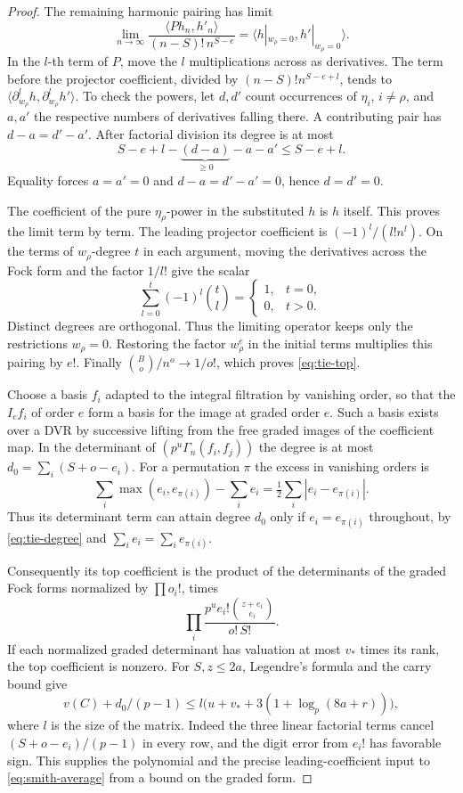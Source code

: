 \begin{proof}
The remaining harmonic pairing has limit
\[
  \lim_{n\to\infty}\frac{\langle P h_n,h'_n\rangle}
                            {(n-S)!\,n^{S-e}}
       =\langle h|_{w_\rho=0},h'|_{w_\rho=0}\rangle .
\]
In the \(l\)-th term of \(P\), move the \(l\) multiplications
across as derivatives. The term before the projector coefficient,
divided by \((n-S)! n^{S-e+l}\), tends to
\(\langle \partial_{w_\rho}^l h,\partial_{w_\rho}^l h'\rangle\).
To check the powers, let \(d,d'\) count occurrences of
\(\eta_i\), \(i\ne\rho\), and \(a,a'\) the respective numbers
of derivatives falling there. A contributing pair has
\(d-a=d'-a'\). After factorial division its degree is at most
\[
 S-e+l-\underbrace{(d-a)}_{\ge0}-a-a'\le S-e+l.
\]
Equality forces \(a=a'=0\) and \(d-a=d'-a'=0\), hence \(d=d'=0\).

The coefficient of the pure
\(\eta_\rho\)-power in the substituted \(h\) is \(h\) itself.
This proves the limit term by term. The leading projector
coefficient is \((-1)^l/(l! n^l)\). On the terms of \(w_\rho\)-degree \(t\) in each argument,
moving the derivatives across the Fock form and the factor
\(1/l!\) give the scalar
\[
       \sum_{l=0}^t(-1)^l\binom tl
           =\begin{cases}1,&t=0,\\0,&t>0.\end{cases}
\]
Distinct degrees are orthogonal. Thus the limiting operator
keeps only the restrictions \(w_\rho=0\). Restoring the factor
\(w_\rho^e\) in the initial terms multiplies this pairing by
\(e!\). Finally \(\binom Bo/n^o\to1/o!\),
which proves \eqref{eq:tie-top}.

Choose a basis \(f_i\) adapted to the integral filtration by
vanishing order, so that the \(I_e f_i\) of order \(e\) form
a basis for the image at graded order \(e\). Such a basis
exists over a DVR by successive lifting from the free graded
images of the coefficient map. In the determinant of
\((p^u\Gamma_n(f_i,f_j))\) the degree is at most
\(d_0=\sum_i(S+o-e_i)\). For a permutation \(\pi\) the excess in vanishing orders is
\[
 \sum_i\max(e_i,e_{\pi(i)})-\sum_i e_i =\tfrac12\sum_i|e_i-e_{\pi(i)}|.
\]
Thus its determinant term can attain degree \(d_0\) only if \(e_i=e_{\pi(i)}\) throughout, by
\eqref{eq:tie-degree} and \(\sum_i e_i=\sum_i e_{\pi(i)}\).

Consequently its top coefficient is the product of the
determinants of the graded Fock forms normalized by \(\prod o_i!\),
times
\[
                  \prod_i\frac{p^u e_i!\binom{z+e_i}{e_i}}
                                         {o!\,S!}.
\]
If each normalized graded determinant has valuation at most
\(v_*\) times its rank, the top coefficient is nonzero. For
\(S,z\le2a\), Legendre's formula and the carry bound give
\[
  v(C)+d_0/(p-1)\le l\big(u+v_*+3(1+\log_p(8a+r))\big),
\]
where \(l\) is the size of the matrix. Indeed the three
linear factorial terms cancel \((S+o-e_i)/(p-1)\) in every
row, and the digit error from \(e_i!\) has favorable sign.
This supplies the polynomial and the precise leading-coefficient
input to \eqref{eq:smith-average} from a bound on the graded
form.
\end{proof}
